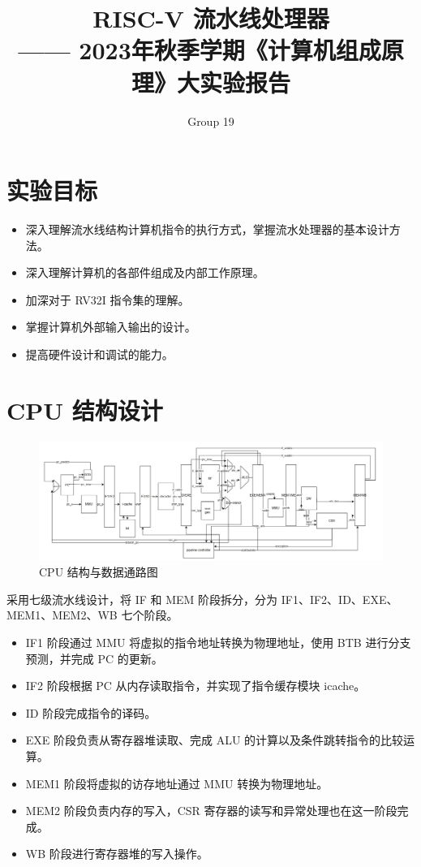 \documentclass[12pt,a4paper,oneside]{ctexart}
\title{RISC-V 流水线处理器 \\   
        \large{—— 2023年秋季学期《计算机组成原理》大实验报告}}
\author{
    Group 19
}
\date{\kaishu{\today}}
\begin{document}
\maketitle
\newpage
\tableofcontents
\newpage


\section{实验目标}

\begin{itemize}
    \item 深入理解流水线结构计算机指令的执行方式，掌握流水处理器的基本设计方法。
    \item 深入理解计算机的各部件组成及内部工作原理。
    \item 加深对于 RV32I 指令集的理解。
    \item 掌握计算机外部输入输出的设计。
    \item 提高硬件设计和调试的能力。
\end{itemize}


\section{CPU 结构设计}
\begin{figure}[ht]
    \centering
    \includegraphics[scale=0.26]{assets/cpu.png}
    \caption{CPU 结构与数据通路图}
    \label{fig:cpu}
\end{figure}

采用七级流水线设计，将 IF 和 MEM 阶段拆分，分为 IF1、IF2、ID、EXE、MEM1、MEM2、WB 七个阶段。
\begin{itemize}
    \item IF1 阶段通过 MMU 将虚拟的指令地址转换为物理地址，使用 BTB 进行分支预测，并完成 PC 的更新。
    \item IF2 阶段根据 PC 从内存读取指令，并实现了指令缓存模块 icache。
    \item ID 阶段完成指令的译码。
    \item EXE 阶段负责从寄存器堆读取、完成 ALU 的计算以及条件跳转指令的比较运算。
    \item MEM1 阶段将虚拟的访存地址通过 MMU 转换为物理地址。
    \item MEM2 阶段负责内存的写入，CSR 寄存器的读写和异常处理也在这一阶段完成。
    \item WB 阶段进行寄存器堆的写入操作。
\end{itemize}
\end{document}
